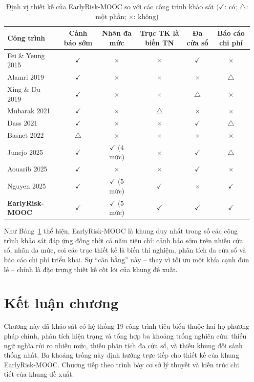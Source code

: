 \begin{table}[H]
\centering
\caption{Định vị thiết kế của EarlyRisk-MOOC so với các công trình khảo sát ($\checkmark$: có; $\triangle$: một phần; $\times$: không)}
\label{tab:dinhvi}
\renewcommand{\arraystretch}{1.3}
\footnotesize
\begin{tabularx}{\textwidth}{@{}p{3.1cm} c c c c c@{}}
\toprule
\textbf{Công trình} & \textbf{Cảnh báo sớm} & \textbf{Nhãn đa mức} & \textbf{Trục TK là biến TN} & \textbf{Đa cửa sổ} & \textbf{Báo cáo chi phí} \\
\midrule
Fei \& Yeung 2015 & $\checkmark$ & $\times$ & $\times$ & $\checkmark$ & $\times$ \\
Alamri 2019 & $\checkmark$ & $\times$ & $\times$ & $\times$ & $\triangle$ \\
Xing \& Du 2019 & $\checkmark$ & $\times$ & $\times$ & $\triangle$ & $\times$ \\
Mubarak 2021 & $\checkmark$ & $\times$ & $\triangle$ & $\times$ & $\times$ \\
Dass 2021 & $\checkmark$ & $\times$ & $\times$ & $\checkmark$ & $\triangle$ \\
Basnet 2022 & $\triangle$ & $\times$ & $\times$ & $\times$ & $\times$ \\
Junejo 2025 & $\checkmark$ & $\checkmark$ (4 mức) & $\times$ & $\checkmark$ & $\triangle$ \\
Aouarib 2025 & $\checkmark$ & $\times$ & $\times$ & $\checkmark$ & $\times$ \\
Nguyen 2025 & $\checkmark$ & $\checkmark$ (5 mức) & $\checkmark$ & $\times$ & $\checkmark$ \\
\textbf{EarlyRisk-MOOC} & $\checkmark$ & $\checkmark$ (5 mức) & $\checkmark$ & $\checkmark$ & $\checkmark$ \\
\bottomrule
\end{tabularx}
\end{table}

Như Bảng~\ref{tab:dinhvi} thể hiện, EarlyRisk-MOOC là khung duy nhất trong số các công trình khảo sát đáp ứng đồng thời cả năm tiêu chí: cảnh báo sớm trên nhiều cửa sổ, nhãn đa mức, coi các trục thiết kế là biến thí nghiệm, phân tích đa cửa sổ và báo cáo chi phí triển khai. Sự ``cân bằng'' này -- thay vì tối ưu một khía cạnh đơn lẻ -- chính là đặc trưng thiết kế cốt lõi của khung đề xuất.

\section{Kết luận chương}

Chương này đã khảo sát có hệ thống 19 công trình tiêu biểu thuộc hai họ phương pháp chính, phân tích hiện trạng và tổng hợp ba khoảng trống nghiên cứu: thiếu ngữ nghĩa rủi ro nhiều mức, thiếu phân tích đa cửa sổ, và thiếu khung đối sánh thống nhất. Ba khoảng trống này định hướng trực tiếp cho thiết kế của khung EarlyRisk-MOOC. Chương tiếp theo trình bày cơ sở lý thuyết và kiến trúc chi tiết của khung đề xuất.

\clearpage
